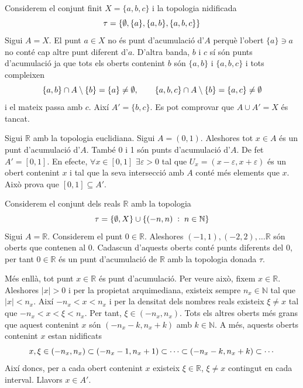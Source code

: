 \documentclass[../main.tex]{subfiles}
\begin{document}
\begin{ej}
\label{ej:acumulacio1} Considerem el conjunt finit $X = \{a,b,c\}$ i la topologia nidificada
\begin{equation}
    \notag
    \tau = \{\emptyset,\{a\},\{a,b\},\{a,b,c\}\}
\end{equation}
Sigui $A =X$. El punt $a\in X$ no és punt d'acumulació d'$A$ perquè l'obert $\{a\}\ni a$ no conté cap altre punt diferent d'$a$. D'altra banda, $b$ i $c$ sí són punts d'acumulació ja que tots els oberts contenint $b$ són $\{a,b\}$ i $\{a,b,c\}$ i tots compleixen
\begin{equation}
    \notag
    \{a,b\}\cap A \setminus\{b\} = \{a\}\not=\emptyset,\qquad \{a,b,c\}\cap A\setminus\{b\} = \{a,c\}\not=\emptyset
\end{equation}
i el mateix passa amb $c$. Així $A'=\{b,c\}$. Es pot comprovar que $A\cup A' = X$ és tancat.
\end{ej}

\begin{ej}
\label{ej:acumulacio2} Sigui $\mathbb{R}$ amb la topologia euclidiana. Sigui $A = (0,1)$. Aleshores tot $x\in A$ és un punt d'acumulació d'$A$. També 0 i 1 són punts d'acumulació d'$A$. De fet $A' = [0,1]$. En efecte, $\forall x\in [0,1]$ $\exists\varepsilon>0$ tal que $U_x = (x-\varepsilon,x+\varepsilon)$ és un obert contenint $x$ i tal que la seva intersecció amb $A$ conté més elements que $x$. Això prova que $[0,1]\subseteq A'$.
\end{ej}

\begin{ej}
\label{ej:acumulacio3} Considerem el conjunt dels reals $\mathbb{R}$ amb la topologia
\begin{equation}
    \notag
    \tau = \{\emptyset,X\}\cup\{(-n,n)\;:\;n\in\mathbb{N}\}
\end{equation}
Sigui $A = \mathbb{R}$. Considerem el punt $0\in\mathbb{R}$. Aleshores $(-1,1),(-2,2),\ldots\mathbb{R}$ són oberts que contenen al 0. Cadascun d'aquests oberts conté punts diferents del 0, per tant $0\in\mathbb{R}$ és un punt d'acumulació de $\mathbb{R}$ amb la topologia donada $\tau$.

Més enllà, tot punt $x\in \mathbb{R}$ és punt d'acumulació. Per veure això, fixem $x\in\mathbb{R}$. Aleshores $|x|>0$ i per la propietat arquimediana, existeix sempre $n_x\in\mathbb{N}$ tal que $|x|<n_x$. Així $-n_x<x<n_x$ i per la densitat dels nombres reals existeix $\xi\not=x$ tal que $-n_x<x<\xi<n_x$. Per tant, $\xi\in(-n_x,n_x)$. Tots els altres oberts més grans que aquest contenint $x$ són $(-n_x-k,n_x+k)$ amb $k\in\mathbb{N}$. A més, aquests oberts contenint $x$ estan nidificats
\begin{equation}
    \notag
    x,\xi\in (-n_x,n_x)\subset(-n_x-1,n_x+1)\subset\cdots\subset(-n_x-k,n_x+k)\subset\cdots
\end{equation}
Així doncs, per a cada obert contenint $x$ existeix $\xi\in\mathbb{R}$, $\xi\not=x$ contingut en cada interval. Llavors $x\in A'$.
\end{ej}
\end{document}
